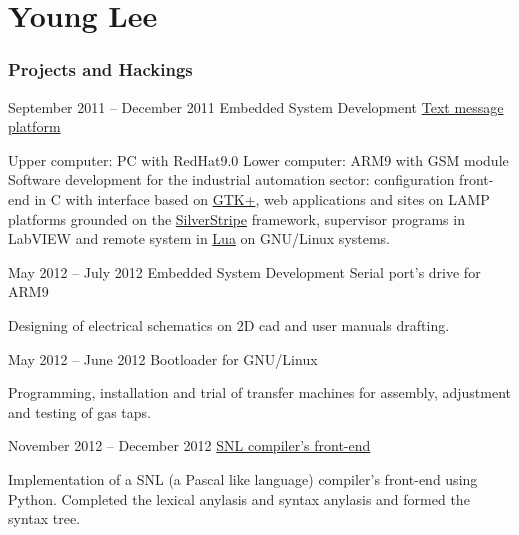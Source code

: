 \documentclass{tccv}
\begin{document}
\part{Young Lee}

\section{Projects and Hackings}    %

\begin{eventlist}


\item{September 2011 -- December 2011}
  {Embedded System Development}
  {\href{https://github.com/YoungLeeNENU/MessagePlatform}{Text message platform}}
  
  Upper computer: PC with RedHat9.0
  Lower computer: ARM9 with GSM module
  Software development for the industrial automation sector: configuration
  front-end in C with interface based on \href{http://www.gtk.org/}{GTK+},
  web applications and sites on LAMP platforms grounded on the
  \href{https://github.com/YoungLeeNENU/MessagePlatform}{SilverStripe} framework,
  supervisor programs in LabVIEW and remote system in
  \href{http://www.lua.org/}{Lua} on GNU/Linux systems.

\item{May 2012 -- July 2012}
  {Embedded System Development}
  {Serial port's drive for ARM9}

  Designing of electrical schematics on
  2D cad and user manuals drafting.

\item{May 2012 -- June 2012}
  {}
  {Bootloader for GNU/Linux}

  Programming, installation and trial of transfer machines for assembly,
  adjustment and testing of gas taps. 

\item{November 2012 -- December 2012}
  {}
  {\href{https://github.com/YoungLeeNENU/A-samll-compiler-frontend}{SNL compiler's front-end}}

  Implementation of a SNL (a Pascal like language) compiler's front-end using Python.
  Completed the lexical anylasis and syntax anylasis and formed the syntax tree.



\end{eventlist}
\end{document}
